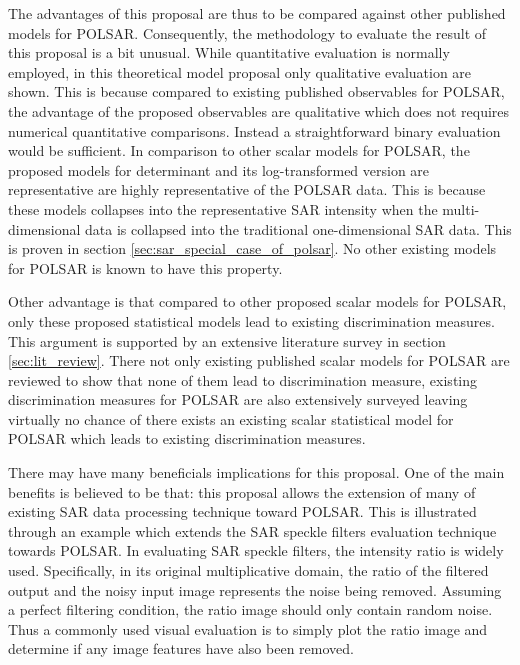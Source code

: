 \documentclass[journal]{IEEEtran}
\begin{document}
The advantages of this proposal are thus to be compared against other published models for POLSAR.
Consequently, the methodology to evaluate the result of this proposal is a bit unusual.
While quantitative evaluation is normally employed, in this theoretical model proposal only qualitative evaluation are shown.
This is because compared to existing published observables for POLSAR, the advantage of the proposed observables are qualitative which does not requires numerical quantitative comparisons.
Instead a straightforward binary evaluation would be sufficient.
In comparison to other scalar models for POLSAR, the proposed models for determinant and its log-transformed version are representative are highly representative of the POLSAR data.
This is because these models collapses into the representative SAR intensity when the multi-dimensional data is collapsed into the traditional one-dimensional SAR data.
This is proven in section \ref{sec:sar_special_case_of_polsar}.
No other existing models for POLSAR is known to have this property.

Other advantage is that compared to other proposed scalar models for POLSAR, only these proposed statistical models lead to existing discrimination measures.
This argument is supported by an extensive literature survey in section \ref{sec:lit_review}.
There not only existing published scalar models for POLSAR are reviewed to show that none of them lead to discrimination measure,
  existing discrimination measures for POLSAR are also extensively surveyed leaving virtually no chance of there exists an existing scalar statistical model for POLSAR which leads to existing discrimination measures.

There may have many beneficials implications for this proposal.
One of the main benefits is believed to be that:
  this proposal allows the extension of many of existing SAR data processing technique toward POLSAR.
This is illustrated through an example which extends the SAR speckle filters evaluation technique towards POLSAR.  
In evaluating SAR speckle filters, the intensity ratio is widely used.
Specifically, in its original multiplicative domain, the ratio of the filtered output and the noisy input image represents the noise being removed.
Assuming a perfect filtering condition, the ratio image should only contain random noise.
Thus a commonly used visual evaluation is to simply plot the ratio image and determine if any image features have also been removed.
\end{document}
